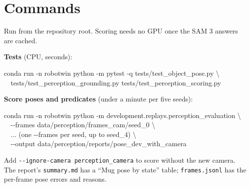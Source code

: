 \documentclass[11pt,a4paper]{article}
\begin{document}
\begin{center}
\end{center}

\section{Commands}

Run from the repository root. Scoring needs no GPU once the SAM 3 answers are cached.

\textbf{Tests} (CPU, seconds):
\begin{cmd}
conda run -n robotwin python -m pytest -q tests/test\_object\_pose.py \textbackslash\\
\ \ tests/test\_perception\_grounding.py tests/test\_perception\_scoring.py
\end{cmd}

\textbf{Score poses and predicates} (under a minute per five seeds):
\begin{cmd}
conda run -n robotwin python -m development.replays.perception\_evaluation \textbackslash\\
\ \ -{}-frames data/perception/frames\_cam/seed\_0 \textbackslash\\
\ \ ... (one -{}-frames per seed, up to seed\_4) \textbackslash\\
\ \ -{}-output data/perception/reports/pose\_dev\_with\_camera
\end{cmd}
Add \texttt{-{}-ignore-camera perception\_camera} to score without the new camera. The report's
\texttt{summary.md} has a ``Mug pose by state'' table; \texttt{frames.jsonl} has the per-frame
pose errors and reasons.
\end{document}
